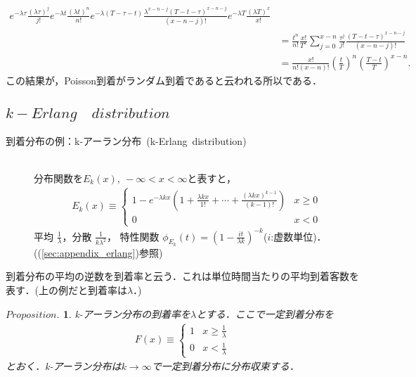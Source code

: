 \documentclass[a4j,papersize,disablejfam,slide,14pt]{jsarticle}
\newtheorem{Prop}{$Proposition.$}
\def\exp#1{e^{#1}} %
\begin{document}
\begin{description}
\begin{align}
{                	\exp{-\lambda \tau} \frac{(\lambda \tau)^j}{j!} 
                    \exp{-\lambda t} \frac{(\lambda t)^n}{n!} 
                    \exp{-\lambda (T - \tau - t)} \frac{\lambda^{x-n-j} (T - t - \tau)^{x-n-j}}{(x-n-j)!}}{\exp{-\lambda T} \frac{(\lambda T)^x}{x!}} \\
                &= \frac{t^n}{n!} \frac{x!}{T^x} \sum_{j=0}^{x-n} \frac{\tau^j}{j!} \frac{(T - t - \tau)^{x-n-j}}{(x-n-j)!} \\
                &= \frac{x!}{n!(x-n)!} \left( \frac{t}{T} \right)^n \left( \frac{T-t}{T} \right)^{x-n}.
            \end{align}
            この結果が，{\rm Poisson}到着がランダム到着であると云われる所以である．
    \end{description}
    
\subsection{$k-Erlang\quad distribution$}
	\begin{description}
    	\item[到着分布の例：{\rm k-}アーラン分布\ {\rm (k-Erlang\ distribution)}]\mbox{}\\
    		分布関数を$E_k(x),\ -\infty < x < \infty$と表すと，
    		\begin{align}
    			E_k(x) \equiv
        		\begin{cases}
        			1 - \exp{-\lambda k x} \left( 1 + \frac{\lambda k x}{1!} + \cdots + \frac{(\lambda k x)^{k-1}}{(k-1)!} \right) & \text{$x \geq 0$}\\
    				0 & \text{$x < 0$}
        		\end{cases}
    		\end{align}
            平均 $\frac{1}{\lambda}$，分散 $\frac{1}{k\lambda^2}$，
            特性関数 $\phi_{E_k}(t) = \left( 1 - \frac{it}{\lambda k} \right)^{-k}$($i$:虚数単位)．((\ref{sec:appendix_erlang})参照)
    \end{description}
    到着分布の平均の逆数を到着率と云う．これは単位時間当たりの平均到着客数を表す．(上の例だと到着率は$\lambda$．) \\
	\begin{screen}
    	\begin{Prop}
        	{\rm k-}アーラン分布の到着率を$\lambda$とする．ここで一定到着分布を
            \begin{align}
            	F(x) \equiv
                \begin{cases}
                	1 & \text{$x \geq \frac{1}{\lambda}$}\\
                    0 & \text{$x < \frac{1}{\lambda}$}
                \end{cases}
            \end{align}
            とおく．{\rm k-}アーラン分布は$k \rightarrow \infty$で一定到着分布に分布収束する．
        \end{Prop}
    \end{screen}
\end{document}
